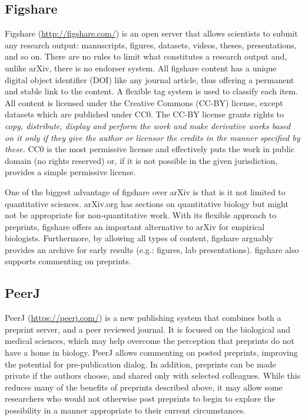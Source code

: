 \documentclass[letterpaper,twocolumn,superscriptaddress,showkeys,longbibliography]{revtex4-1}
\begin{document}
\subsection{Figshare}

Figshare (\href{http://figshare.com/}{http://figshare.com/}) is an open server
that allows scientists to submit any research output: manuscripts, figures,
datasets, videos, theses, presentations, and so on. There are no rules to limit
what constitutes a research output and, unlike arXiv, there is no endorser
system. All figshare content has a unique digital object identifier (DOI) like
any journal article, thus offering a permanent and stable link to the content.
A flexible tag system is used to classify each item. All content
is licensed under the Creative Commons (CC-BY) license, except
datasets which are published under CC0. The CC-BY license grants rights to
\emph{copy, distribute, display and perform the work and make derivative works
based on it only if they give the author or licensor the credits in the manner
specified by these.}  CC0 is the most permissive license and effectively puts
the work in public domain (no rights reserved) or, if it is not possible in the
given jurisdiction, provides a simple permissive license.

One of the biggest advantage of figshare over arXiv is that is it not limited to
quantitative sciences. arXiv.org has sections on quantitative biology but might
not be appropriate for non-quantitative work. With its flexible approach to
preprints, figshare offers an important alternative to arXiv for empirical
biologists. Furthermore, by allowing all types of content, figshare arguably
provides an archive for early results (e.g.: figures, lab presentations).
figshare also supports commenting on preprints.

\subsection{PeerJ}

PeerJ (\href{https://peerj.com/}{https://peerj.com/}) is a new publishing system
that combines both a preprint server, and a peer reviewed journal.  It is
focused on the biological and medical sciences, which may help overcome the
perception that preprints do not have a home in biology.  PeerJ allows
commenting on posted preprints, improving the potential for pre-publication
dialog. In addition, preprints can be made private if the authors choose, and
shared only with selected colleagues. While this reduces many of the benefits of
preprints described above, it may allow some researchers who would not otherwise
post preprints to begin to explore the possibility in a manner appropriate to
their current circumstances.
\end{document}

